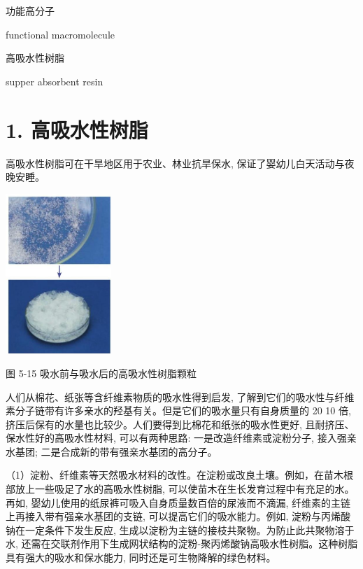 \documentclass[10pt]{article}
\begin{document}
\begin{mdframed}

功能高分子

functional macromolecule

高吸水性树脂

supper absorbent resin

\end{mdframed}

\section*{1. 高吸水性树脂}

高吸水性树脂可在干旱地区用于农业、林业抗旱保水, 保证了婴幼儿白天活动与夜晚安睡。

\begin{center}
\includegraphics[max width=0.3\textwidth]{images/0190efc5-b58a-7c43-bfb0-e0a030df9cfd_151_614536.jpg}
\end{center}

图 5-15 吸水前与吸水后的高吸水性树脂颗粒

人们从棉花、纸张等含纤维素物质的吸水性得到启发, 了解到它们的吸水性与纤维素分子链带有许多亲水的羟基有关。但是它们的吸水量只有自身质量的 20 10 倍, 挤压后保有的水量也比较少。人们要得到比棉花和纸张的吸水性更好, 且耐挤压、保水性好的高吸水性材料, 可以有两种思路: 一是改造纤维素或淀粉分子, 接入强亲水基团; 二是合成新的带有强亲水基团的高分子。

（1）淀粉、纤维素等天然吸水材料的改性。在淀粉或改良土壤。例如，在苗木根部放上一些吸足了水的高吸水性树脂, 可以使苗木在生长发育过程中有充足的水。再如, 婴幼儿使用的纸尿裤可吸入自身质量数百倍的尿液而不滴漏, 纤维素的主链上再接入带有强亲水基团的支链, 可以提高它们的吸水能力。例如, 淀粉与丙烯酸钠在一定条件下发生反应, 生成以淀粉为主链的接枝共聚物。为防止此共聚物溶于水, 还需在交联剂作用下生成网状结构的淀粉-聚丙烯酸钠高吸水性树脂。这种树脂具有强大的吸水和保水能力, 同时还是可生物降解的绿色材料。
\end{document}
